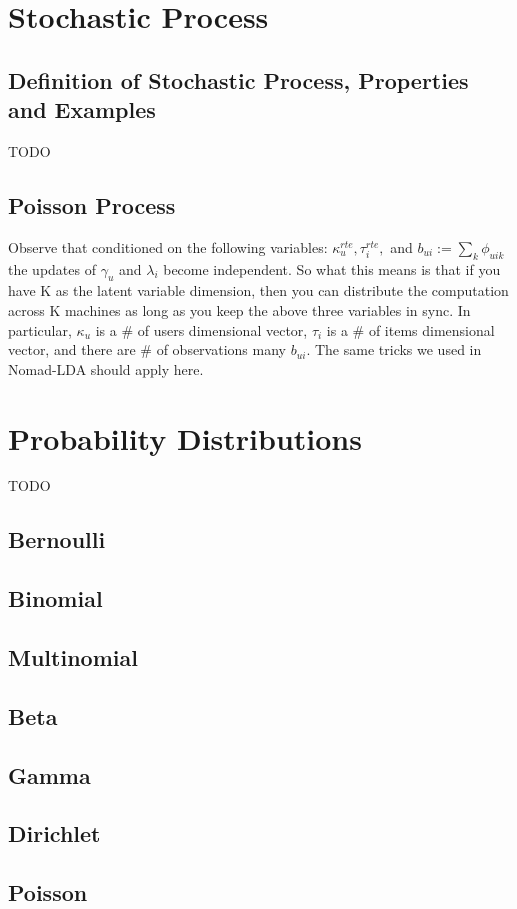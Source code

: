 \documentclass[english, 11pt]{article}
\begin{document}
\newpage

\section{Stochastic Process}
\subsection{Definition of Stochastic Process, Properties and Examples}
TODO
\subsection{Poisson Process}
Observe that conditioned on the following variables: $\kappa_{u}^{rte}, \tau_i^{rte},$ and $b_{ui} := \sum_{k} \phi_{uik}$ the updates of $\gamma_u$ and $\lambda_i$ become  independent. So what this means is that if you have K as the latent variable dimension, then you can distribute the computation across K machines as long as you keep the above three variables in sync. In particular, $\kappa_u$ is a \# of users dimensional vector, $\tau_i$ is a \# of items dimensional vector, and there are \# of observations many $b_{ui}$. The same tricks we used in Nomad-LDA should apply here.

\section{Probability Distributions}
TODO
\subsection{Bernoulli}
\subsection{Binomial}
\subsection{Multinomial}
\subsection{Beta}
\subsection{Gamma}
\subsection{Dirichlet}
\subsection{Poisson}
\end{document}
